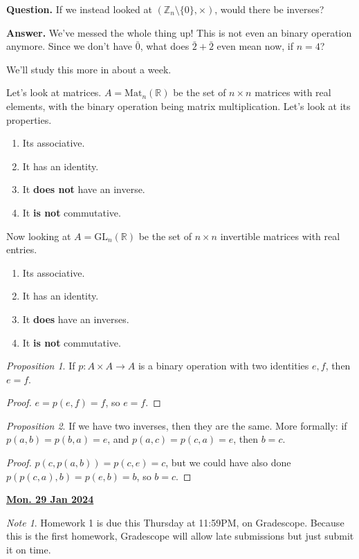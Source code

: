 \documentclass[12pt]{article}
\renewcommand{\date}[1]{\underline{\bf #1}}
\def\mat{\text{Mat}}
\def\gl{\text{GL}}
\def\Z{{\mathbb Z}}
\def\R{{\mathbb R}}
\newcommand{\qna}[2]{
  {\bf Question.} #1

  {\bf Answer.} #2
}
\theoremstyle{remark}
\newtheorem{proposition}{Proposition}
\theoremstyle{remark}
\theoremstyle{remark}
\theoremstyle{remark}
\theoremstyle{remark}
\newtheorem*{note}{Note}
\begin{document}
\qna {
	If we instead looked at $(\Z_n \setminus \{ 0 \}, \times)$, would there be
	inverses?
}
{
	We've messed the whole thing up! This is not even an binary operation
	anymore. Since we don't have $\bar 0$, what does $\bar 2 + \bar 2$ even mean
	now, if $n = 4$?

	We'll study this more in about a week.
}

Let's look at matrices. $A = \mat_n(\R)$ be the set of $n \times n$ matrices
with real elements, with the binary operation being matrix multiplication.
Let's look at its properties.

\begin{enumerate}
	\item Its associative.
	\item It has an identity.
	\item It {\bf does not} have an inverse.
	\item It {\bf is not} commutative.
\end{enumerate}

Now looking at $A = \gl_n(\R)$ be the set of $n \times n$ invertible matrices
with real entries.

\begin{enumerate}
	\item Its associative.
	\item It has an identity.
	\item It {\bf does} have an inverses.
	\item It {\bf is not} commutative.
\end{enumerate}

\begin{proposition}
  If $p: A \times A \to A$ is a binary operation with two identities $e, f$,
  then $e = f$.
\end{proposition}
\begin{proof}
  $e = p(e, f) = f$, so $e = f$.
\end{proof}

\begin{proposition}
  If we have two inverses, then they are the same. More formally: if $p(a, b) =
	p(b, a)= e$, and $p(a, c) = p(c, a) = e$, then $b = c$.
\end{proposition}
\begin{proof}
  $p(c, p(a, b)) = p(c, e) = c$, but we could have also done $p(p(c, a), b) =
	p(e, b) = b$, so $b = c$.
\end{proof}

\date{Mon. 29 Jan 2024}

\begin{note}
	Homework 1 is due this Thursday at 11:59PM, on Gradescope. Because this is
	the first homework, Gradescope will allow late submissions but just submit
	it on time.
\end{note}
\end{document}
